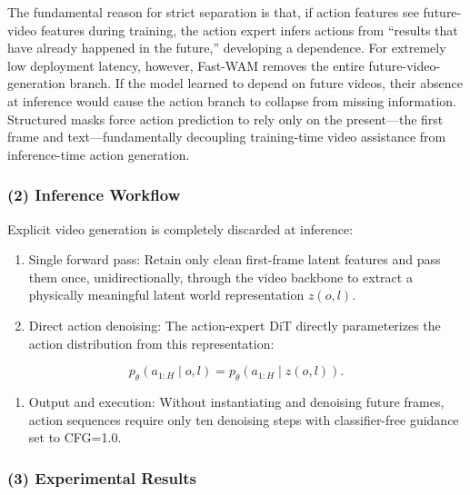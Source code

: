 The fundamental reason for strict separation is that, if action features see future-video features during training, the action expert infers actions from ``results that have already happened in the future,'' developing a dependence. For extremely low deployment latency, however, Fast-WAM removes the entire future-video-generation branch. If the model learned to depend on future videos, their absence at inference would cause the action branch to collapse from missing information. Structured masks force action prediction to rely only on the present---the first frame and text---fundamentally decoupling training-time video assistance from inference-time action generation.

\hypertarget{inference-workflow-2}{%
\subsubsection{(2) Inference Workflow}\label{inference-workflow-2}}

Explicit video generation is completely discarded at inference:

\begin{enumerate}
\def\labelenumi{\arabic{enumi}.}
\tightlist
\item
  Single forward pass: Retain only clean first-frame latent features and pass them once, unidirectionally, through the video backbone to extract a physically meaningful latent world representation \(z(o,l)\).
\item
{}
  Direct action denoising: The action-expert DiT directly parameterizes the action distribution from this representation:
\end{enumerate}

\[
p_\theta(a_{1:H}\mid o,l)=p_\theta(a_{1:H}\mid z(o,l)).
\]

\begin{enumerate}
\def\labelenumi{\arabic{enumi}.}
\setcounter{enumi}{2}
\tightlist
\item
  Output and execution: Without instantiating and denoising future frames, action sequences require only ten denoising steps with classifier-free guidance set to CFG=1.0.
\end{enumerate}

\hypertarget{experimental-results}{%
\subsubsection{(3) Experimental Results}\label{experimental-results}}

